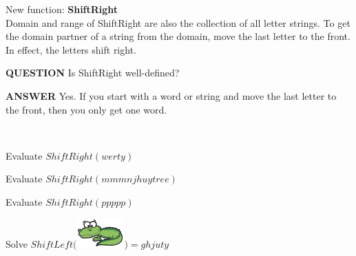 \documentclass{ximera}
\begin{document}
\begin{exploration}

New function: \textbf{ShiftRight} \\
Domain and range of ShiftRight are also the collection of all letter strings. To get the domain partner of a string from the domain, move the last letter to the front.  In effect, the letters shift right. \\


\begin{dialogue}
\item[\textbf{QUESTION}] Is ShiftRight well-defined?
\item[\textbf{ANSWER}] Yes. If you start with a word or string and move the last letter to the front, then you only get one word. 
\end{dialogue}
\quad \\


\begin{question}
Evaluate $ShiftRight(werty)$
\begin{multipleChoice}
\end{multipleChoice}
\end{question}



\begin{question}
Evaluate $ShiftRight(mmmnjhuytree)$
\begin{multipleChoice}
\end{multipleChoice}
\end{question}





\begin{question}
Evaluate $ShiftRight(ppppp)$
\begin{multipleChoice}
\end{multipleChoice}
\end{question}




\begin{question}
Solve $ShiftLeft($\includegraphics{pics/alligator.png}$) = ghjuty$
\begin{multipleChoice}
\end{multipleChoice}
\end{question}




\end{exploration}
\quad \\
\end{document}
